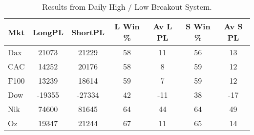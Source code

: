 \begin{table}[ht]
\centering
\caption[Daily High / Low Breakout System]{Results from Daily High / Low Breakout System.} 
\label{tab:hl_bout_sys}
\begin{tabular}{lcccccc}
  \toprule Mkt & LongPL & ShortPL & L Win \% & Av L PL & S Win \% & Av S PL \\ 
  \midrule Dax & 21073 & 21229 & 58 & 11 & 56 & 13 \\ 
  CAC & 14252 & 20176 & 58 & 8 & 59 & 12 \\ 
  F100 & 13239 & 18614 & 59 & 7 & 59 & 12 \\ 
  Dow & -19355 & -27334 & 42 & -11 & 38 & -17 \\ 
  Nik & 74600 & 81645 & 64 & 44 & 64 & 49 \\ 
  Oz & 19347 & 21244 & 67 & 11 & 65 & 14 \\ 
   \bottomrule \end{tabular}
\end{table}
